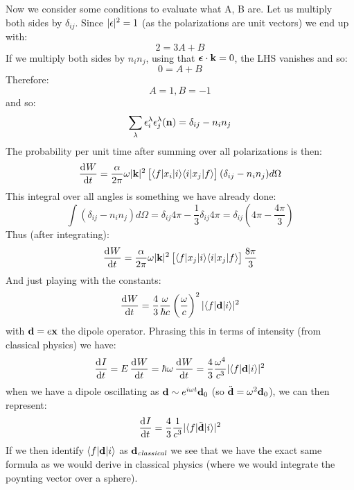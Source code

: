 Now we consider some conditions to evaluate what A, B are. Let us multiply both sides by $\delta_{ij}$. Since $\lvert \epsilon \rvert^2 = 1$ (as the polarizations are unit vectors) we end up with:
\begin{equation}
    2 = 3A + B
\end{equation}
If we multiply both sides by $n_in_j$, using that $\mbox{\boldmath$ \epsilon $} \cdot \mathbf{k} = 0$, the LHS vanishes and so:
\begin{equation}
    0 = A + B
\end{equation}
Therefore:
\begin{equation}
    A = 1, B = -1
\end{equation}
and so:
\begin{equation}
    \sum_\lambda \epsilon_i^\lambda \epsilon_j^\lambda(\mathbf{n}) = \delta_{ij} - n_in_j
\end{equation}
The probability per unit time after summing over all polarizations is then:
\begin{equation}
    \dod{W}{t} = \frac{\alpha}{2\pi}\omega\abs{\v{k}}^2\left[\bra{f}x_i\ket{i}\bra{i}x_j\ket{f}\right](\delta_{ij} - n_in_j)d\Omega
\end{equation}
This integral over all angles is something we have already done:
\begin{equation}
    \int(\delta_{ij} - n_in_j)d\Omega = \delta_{ij}4\pi - \frac{1}{3}\delta_{ij}4\pi = \delta_{ij}\left(4\pi - \frac{4\pi}{3}\right)
\end{equation}
Thus (after integrating):
\begin{equation}
    \dod{W}{t} = \frac{\alpha}{2\pi}\omega\abs{\v{k}}^2\left[\bra{f}x_j\ket{i}\bra{i}x_j\ket{f}\right]\frac{8\pi}{3}
\end{equation}
And just playing with the constants:
\begin{equation}
    \dod{W}{t} = \frac{4}{3}\frac{\omega}{\hbar c}\left(\frac{\omega}{c}\right)^2\abs{\bra{f}\v{d}\ket{i}}^2
\end{equation}
with $\mathbf{d} = e\mathbf{x}$ the dipole operator. Phrasing this in terms of intensity (from classical physics) we have:
\begin{equation}
    \dod{I}{t} = E\dod{W}{t} = \hbar\omega \dod{W}{t} = \frac{4}{3}\frac{\omega^4}{c^3}\abs{\bra{f}\v{d}\ket{i}}^2
\end{equation}
when we have a dipole oscillating as $\mathbf{d} \sim e^{i\omega t}\mathbf{d}_0$ (so $\ddot{\mathbf{d}} = \omega^2\mathbf{d}_0$), we can then represent:
\begin{equation}
    \dod{I}{t} = \frac{4}{3}\frac{1}{c^3}\abs{\bra{f}\ddot{\v{d}}\ket{i}}^2
\end{equation}
If we then identify $\langle f \rvert\mathbf{d}\lvert i \rangle$ as $\mathbf{d}_{\emph{classical}}$ we see that we have the exact same formula as we would derive in classical physics (where we would integrate the poynting vector over a sphere).

